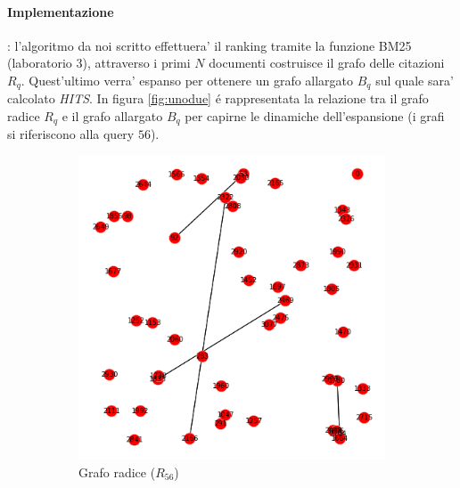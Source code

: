 \paragraph{\textbf{Implementazione}}: l'algoritmo da noi scritto effettuera' il ranking tramite la funzione BM25 (laboratorio 3), attraverso i primi $N$ documenti costruisce il grafo delle citazioni $R_q$. Quest'ultimo verra' espanso per ottenere un grafo allargato $B_q$ sul quale sara' calcolato \textit{HITS}.
In figura \ref{fig:unodue} \'e rappresentata la relazione tra il grafo radice $R_q$ e il grafo allargato $B_q$ per capirne le dinamiche dell'espansione (i grafi si riferiscono alla query $56$).
\begin{figure}
	\centering
	\begin{subfigure}{.5\textwidth}
		\centering
		\includegraphics[width=1\textwidth]{figures/R.png}
		\caption{Grafo radice ($R_{56}$)}
		\label{fig:uno}
	\end{subfigure}%
	\begin{subfigure}{.5\textwidth}
		\centering

\end{subfigure}
\end{figure}
